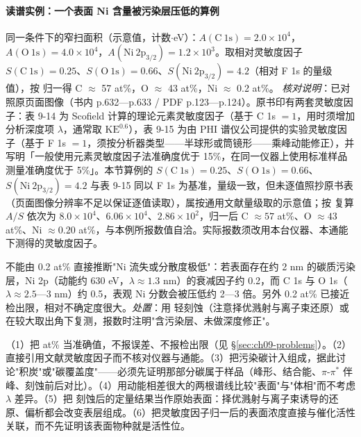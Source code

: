 \paragraph{读谱实例：一个表面 Ni 含量被污染层压低的算例}
\begin{obs}
同一条件下的窄扫面积（示意值，计数$\cdot$eV）：$A(\mathrm{C\ 1s})=2.0\times10^{4}$，$A(\mathrm{O\ 1s})=4.0\times10^{4}$，$A(\mathrm{Ni\ 2p_{3/2}})=1.2\times10^{3}$。取相对灵敏度因子 $S(\mathrm{C\ 1s})=0.25$、$S(\mathrm{O\ 1s})=0.66$、$S(\mathrm{Ni\ 2p_{3/2}})=4.2$（相对 F 1s 的量级值），按 归一得 C $\approx$ 57 at\%，O $\approx$ 43 at\%，Ni $\approx$ 0.2 at\%。
\emph{核对说明}：已对照原页面图像（书内 p.632—p.633 / PDF p.123—p.124）。原书印有两套灵敏度因子：表 9-14 为 Scofield 计算的理论元素灵敏度因子（基于 C 1s $=1$，用时须增加分析深度项 $\lambda$，通常取 $\mathrm{KE}^{0.6}$），表 9-15 为由 PHI 谱仪公司提供的实验灵敏度因子（基于 F 1s $=1$，须按分析器类型——半球形或筒镜形——乘峰动能修正），并写明「一般使用元素灵敏度因子法准确度优于 15\%，在同一仪器上使用标准样品测量准确度优于 5\%」。本节算例的 $S(\mathrm{C\ 1s})=0.25$、$S(\mathrm{O\ 1s})=0.66$、$S(\mathrm{Ni\ 2p_{3/2}})=4.2$ 与表 9-15 同以 F 1s 为基准，量级一致，但未逐值照抄原书表（页面图像分辨率不足以保证逐值读取），属按通用文献量级取的示意值；按 复算 $A/S$ 依次为 $8.0\times10^{4}$、$6.06\times10^{4}$、$2.86\times10^{2}$，归一后 C $\approx57$ at\%、O $\approx43$ at\%、Ni $\approx0.20$ at\%，与本例所报数值自洽。实际报数须改用本台仪器、本通能下测得的灵敏度因子。
\end{obs}
\begin{infer}
不能由 0.2 at\% 直接推断"Ni 流失或分散度极低"：若表面存在约 2 nm 的碳质污染层，Ni 2p（动能约 630 eV，$\lambda\approx1.3$ nm）的衰减因子约 0.2，而 C 1s 与 O 1s（$\lambda\approx2.5$—3 nm）约 0.5，表观 Ni 分数会被压低约 2—3 倍。另外 0.2 at\% 已接近检出限，相对不确定度很大。\emph{处置}：用  轻刻蚀（注意择优溅射与离子束还原）或在较大取出角下复测，报数时注明"含污染层、未做深度修正"。
\end{infer}

\begin{pitfall}
（1）把 at\% 当准确值，不报误差、不报检出限（见 §\ref{sec:ch09-problems}）。（2）直接引用文献灵敏度因子而不核对仪器与通能。（3）把污染碳计入组成，据此讨论"积炭"或"碳覆盖度"——必须先证明那部分碳属于样品（峰形、结合能、$\pi$-$\pi^{*}$ 伴峰、刻蚀前后对比）。（4）用动能相差很大的两根谱线比较"表面"与"体相"而不考虑 $\lambda$ 差异。（5）把  刻蚀后的定量结果当作原始表面：择优溅射与离子束诱导的还原、偏析都会改变表层组成。（6）把灵敏度因子归一后的表面浓度直接与催化活性关联，而不先证明该表面物种就是活性位。
\end{pitfall}

